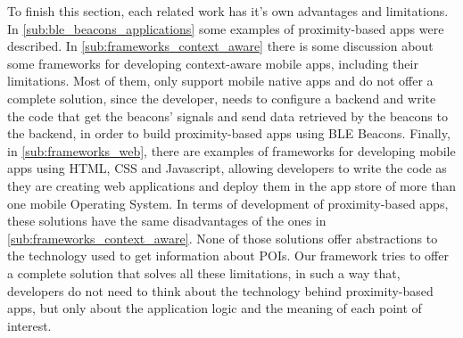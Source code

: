 To finish this section, each related work has it's own
advantages and limitations.
In \ref{sub:ble_beacons_applications} some
examples of proximity-based apps were described.
In \ref{sub:frameworks_context_aware} there is
some discussion about some
frameworks for developing context-aware mobile apps,
including their limitations.
Most of them, only support mobile native apps and
do not offer a complete solution, since the developer,
needs to configure a backend and write the code that
get the beacons' signals and send data retrieved by 
the beacons to the backend, in order to build 
proximity-based apps using BLE Beacons.
Finally, in \ref{sub:frameworks_web}, there are
examples of frameworks for developing mobile apps
using HTML, CSS and Javascript, allowing developers
to write the code as they are creating web applications
and deploy them in the app store of more than one
mobile Operating System.
In terms of development of proximity-based apps,
these solutions have the same disadvantages of the
ones in \ref{sub:frameworks_context_aware}.
None of those solutions offer abstractions to
the technology used to get information about POIs.
Our framework tries 
to offer a complete solution that solves all
these limitations, in such a way that, developers do not
need to think about the technology behind proximity-based
apps, but only about the application logic and the meaning
of each point of interest.